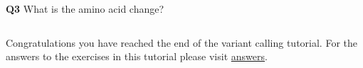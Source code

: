 \documentclass[11pt]{article}
\makeatletter
\newcommand{\boxspacing}{\kern\kvtcb@left@rule\kern\kvtcb@boxsep}
\newcommand{\prompt}[4]{
        {\ttfamily\llap{{\color{#2}[#3]:\hspace{3pt}#4}}\vspace{-\baselineskip}}
    }
\makeatother
\begin{document}
    \textbf{Q3} What is the amino acid change?

    \begin{tcolorbox}[breakable, size=fbox, boxrule=1pt, pad at break*=1mm,colback=cellbackground, colframe=cellborder]
\prompt{In}{incolor}{ }{\boxspacing}
\begin{Verbatim}[commandchars=\\\{\}]

\end{Verbatim}
\end{tcolorbox}

    Congratulations you have reached the end of the variant calling
tutorial. For the answers to the exercises in this tutorial please visit
\href{answers.ipynb}{answers}.


\end{document}
